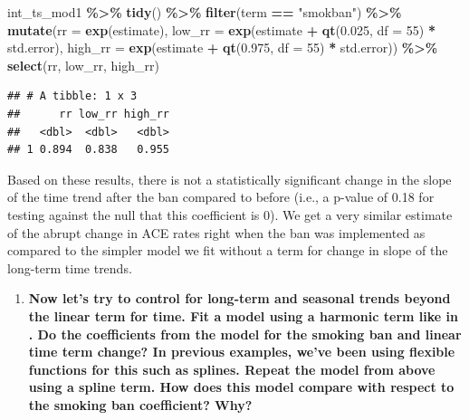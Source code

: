 \documentclass[
]{book}
\newenvironment{Shaded}{\begin{snugshade}}{\end{snugshade}}
\newcommand{\AttributeTok}[1]{\textcolor[rgb]{0.13,0.29,0.53}{#1}}
\newcommand{\DecValTok}[1]{\textcolor[rgb]{0.00,0.00,0.81}{#1}}
\newcommand{\FloatTok}[1]{\textcolor[rgb]{0.00,0.00,0.81}{#1}}
\newcommand{\FunctionTok}[1]{\textcolor[rgb]{0.13,0.29,0.53}{\textbf{#1}}}
\newcommand{\NormalTok}[1]{#1}
\newcommand{\SpecialCharTok}[1]{\textcolor[rgb]{0.81,0.36,0.00}{\textbf{#1}}}
\newcommand{\StringTok}[1]{\textcolor[rgb]{0.31,0.60,0.02}{#1}}
\providecommand{\tightlist}{%
  \setlength{\itemsep}{0pt}\setlength{\parskip}{0pt}}
\begin{document}
\begin{Shaded}
\begin{Highlighting}[]
\NormalTok{int\_ts\_mod1 }\SpecialCharTok{\%\textgreater{}\%} 
  \FunctionTok{tidy}\NormalTok{() }\SpecialCharTok{\%\textgreater{}\%} 
  \FunctionTok{filter}\NormalTok{(term }\SpecialCharTok{==} \StringTok{"smokban"}\NormalTok{) }\SpecialCharTok{\%\textgreater{}\%} 
  \FunctionTok{mutate}\NormalTok{(}\AttributeTok{rr =} \FunctionTok{exp}\NormalTok{(estimate), }
         \AttributeTok{low\_rr =} \FunctionTok{exp}\NormalTok{(estimate }\SpecialCharTok{+} \FunctionTok{qt}\NormalTok{(}\FloatTok{0.025}\NormalTok{, }\AttributeTok{df =} \DecValTok{55}\NormalTok{) }\SpecialCharTok{*}\NormalTok{ std.error), }
         \AttributeTok{high\_rr =} \FunctionTok{exp}\NormalTok{(estimate }\SpecialCharTok{+} \FunctionTok{qt}\NormalTok{(}\FloatTok{0.975}\NormalTok{, }\AttributeTok{df =} \DecValTok{55}\NormalTok{) }\SpecialCharTok{*}\NormalTok{ std.error)) }\SpecialCharTok{\%\textgreater{}\%} 
  \FunctionTok{select}\NormalTok{(rr, low\_rr, high\_rr)}
\end{Highlighting}
\end{Shaded}

\begin{verbatim}
## # A tibble: 1 x 3
##      rr low_rr high_rr
##   <dbl>  <dbl>   <dbl>
## 1 0.894  0.838   0.955
\end{verbatim}

Based on these results, there is not a statistically significant change in the slope of the time trend after the ban compared to before (i.e., a p-value of 0.18 for testing against the null that this coefficient is 0). We get a very similar estimate of the abrupt change in ACE rates right when the ban was implemented as compared to the simpler model we fit without a term for change in slope of the long-term time trends.

\begin{enumerate}
\def\labelenumi{\arabic{enumi}.}
\setcounter{enumi}{3}
\tightlist
\item
  \textbf{Now let's try to control for long-term and seasonal trends beyond the linear term for time. Fit a model using a harmonic term like in \citet{bernal2017interrupted}. Do the coefficients from the model for the smoking ban and linear time term change? In previous examples, we've been using flexible functions for this such as splines. Repeat the model from above using a spline term. How does this model compare with respect to the smoking ban coefficient? Why?}
\end{enumerate}
\end{document}
